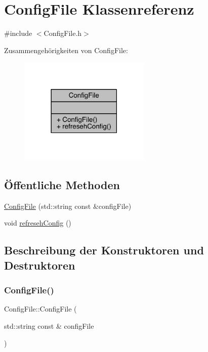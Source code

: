 \hypertarget{class_config_file}{}\section{Config\+File Klassenreferenz}
\label{class_config_file}


{\ttfamily \#include $<$Config\+File.\+h$>$}



Zusammengehörigkeiten von Config\+File\+:\nopagebreak
\begin{figure}[H]
\begin{center}
\leavevmode
\includegraphics[width=177pt]{class_config_file__coll__graph}
\end{center}
\end{figure}
\subsection*{Öffentliche Methoden}
\begin{DoxyCompactItemize}
\item 
\hyperlink{class_config_file_ab61f21b62426fa46dc4c581d3fdf4e5e}{Config\+File} (std\+::string const \&config\+File)
\item 
void \hyperlink{class_config_file_a48a2e1c781af3f0947c93d1d37e5b71a}{refreseh\+Config} ()
\end{DoxyCompactItemize}


\subsection{Beschreibung der Konstruktoren und Destruktoren}
\hypertarget{class_config_file_ab61f21b62426fa46dc4c581d3fdf4e5e}{}\label{class_config_file_ab61f21b62426fa46dc4c581d3fdf4e5e} 
\subsubsection{\texorpdfstring{Config\+File()}{ConfigFile()}}
{\footnotesize\ttfamily Config\+File\+::\+Config\+File (\begin{DoxyParamCaption}\item[{std\+::string const \&}]{config\+File }\end{DoxyParamCaption})}




